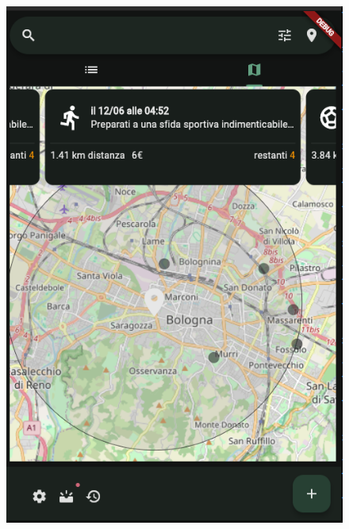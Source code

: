\documentclass[a4paper,12pt]{article}
\begin{document}
\begin{figure}[h]
    \begin{minipage}{0.32\textwidth}
        \centering
        \includegraphics[width=1\linewidth]{img/search_map_page.png}
    \end{minipage}
    \begin{minipage}{0.32\textwidth}
        \centering

\end{minipage}
\end{figure}
\end{document}
